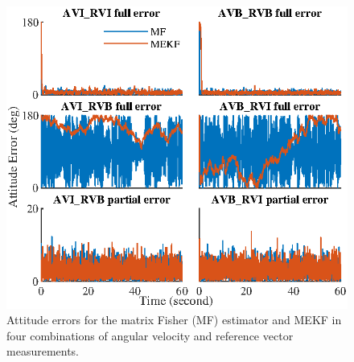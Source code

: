 \begin{figure}
	\centering
	\includegraphics[scale=1.4]{figures/observability/attitudeError}
	\caption{Attitude errors for the matrix Fisher (MF) estimator and MEKF in four combinations of angular velocity and reference vector measurements. \label{fig:observability-attitudeError}}
\end{figure}


